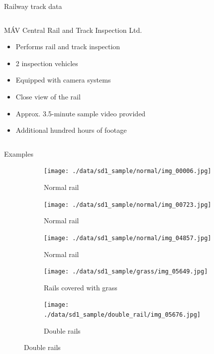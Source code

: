 \documentclass[aspectratio=169]{beamer}
\begin{document}
\begin{frame}{Railway track data}
\begin{columns}[c]
        \begin{column}{0.7\textwidth}
            MÁV Central Rail and Track Inspection Ltd.
            \begin{itemize}
                \item Performs rail and track inspection
                \item 2 inspection vehicles
                \item Equipped with camera systems
                \item Close view of the rail
                \item Approx. 3.5-minute sample video provided
                \item Additional hundred hours of footage
            \end{itemize}
        \end{column}
    \end{columns}
\end{frame}

\begin{frame}{Examples}
    \begin{figure}
        \centering
        \begin{subfigure}{0.3\textwidth}
            \centering
            \texttt{[image: ./data/sd1\_sample/normal/img\_00006.jpg]}
            \caption*{Normal rail}
        \end{subfigure}
        \begin{subfigure}{0.3\textwidth}
            \centering
            \texttt{[image: ./data/sd1\_sample/normal/img\_00723.jpg]}
            \caption*{Normal rail}
        \end{subfigure}
        \begin{subfigure}{0.3\textwidth}
            \centering
            \texttt{[image: ./data/sd1\_sample/normal/img\_04857.jpg]}
            \caption*{Normal rail}
        \end{subfigure}
        \begin{subfigure}{0.3\textwidth}
            \centering
            \texttt{[image: ./data/sd1\_sample/grass/img\_05649.jpg]}
            \caption*{Rails covered with grass}
        \end{subfigure}
        \begin{subfigure}{0.3\textwidth}
            \centering
            \texttt{[image: ./data/sd1\_sample/double\_rail/img\_05676.jpg]}
            \caption*{Double rails}
        \end{subfigure}
    \end{figure}
\end{frame}
\end{document}
